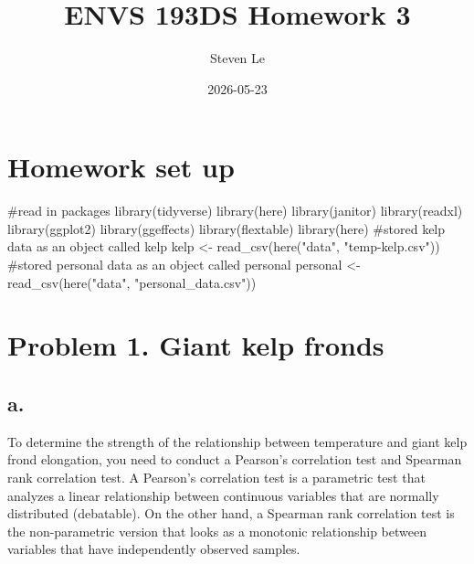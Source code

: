 \documentclass[
  letterpaper,
  DIV=11,
  numbers=noendperiod]{scrartcl}
\title{ENVS 193DS Homework 3}
\author{Steven Le}
\date{2026-05-23}
\newenvironment{Shaded}{\begin{snugshade}}{\end{snugshade}}
\newcommand{\CommentTok}[1]{\textcolor[rgb]{0.37,0.37,0.37}{#1}}
\newcommand{\FunctionTok}[1]{\textcolor[rgb]{0.28,0.35,0.67}{#1}}
\newcommand{\NormalTok}[1]{\textcolor[rgb]{0.00,0.23,0.31}{#1}}
\newcommand{\OtherTok}[1]{\textcolor[rgb]{0.00,0.23,0.31}{#1}}
\newcommand{\StringTok}[1]{\textcolor[rgb]{0.13,0.47,0.30}{#1}}
\begin{document}
\maketitle


\section{Homework set up}\label{homework-set-up}

\begin{Shaded}
\begin{Highlighting}[]
\CommentTok{\#read in packages}
\FunctionTok{library}\NormalTok{(tidyverse)}
\FunctionTok{library}\NormalTok{(here)}
\FunctionTok{library}\NormalTok{(janitor)}
\FunctionTok{library}\NormalTok{(readxl)}
\FunctionTok{library}\NormalTok{(ggplot2)}
\FunctionTok{library}\NormalTok{(ggeffects)}
\FunctionTok{library}\NormalTok{(flextable)}
\FunctionTok{library}\NormalTok{(here)}
\CommentTok{\#stored kelp data as an object called kelp}
\NormalTok{kelp }\OtherTok{\textless{}{-}} \FunctionTok{read\_csv}\NormalTok{(}\FunctionTok{here}\NormalTok{(}\StringTok{"data"}\NormalTok{, }\StringTok{"temp{-}kelp.csv"}\NormalTok{))}
\CommentTok{\#stored personal data as an object called personal}
\NormalTok{personal }\OtherTok{\textless{}{-}} \FunctionTok{read\_csv}\NormalTok{(}\FunctionTok{here}\NormalTok{(}\StringTok{"data"}\NormalTok{, }\StringTok{"personal\_data.csv"}\NormalTok{))}
\end{Highlighting}
\end{Shaded}

\section{Problem 1. Giant kelp
fronds}\label{problem-1.-giant-kelp-fronds}

\subsection{a.}\label{a.}

To determine the strength of the relationship between temperature and
giant kelp frond elongation, you need to conduct a Pearson's correlation
test and Spearman rank correlation test. A Pearson's correlation test is
a parametric test that analyzes a linear relationship between continuous
variables that are normally distributed (debatable). On the other hand,
a Spearman rank correlation test is the non-parametric version that
looks as a monotonic relationship between variables that have
independently observed samples.
\end{document}
